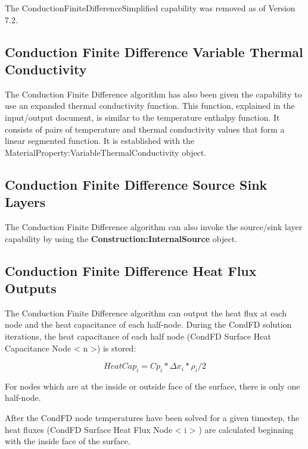 The ConductionFiniteDifferenceSimplified capability was removed as of Version 7.2.

\subsection{Conduction Finite Difference Variable Thermal Conductivity}\label{conduction-finite-difference-variable-thermal-conductivity}

The Conduction Finite Difference algorithm has also been given the capability to use an expanded thermal conductivity function. This function, explained in the input/output document, is similar to the temperature enthalpy function. It consists of pairs of temperature and thermal conductivity values that form a linear segmented function. It is established with the MaterialProperty:VariableThermalConductivity object.

\subsection{Conduction Finite Difference Source Sink Layers}\label{conduction-finite-difference-source-sink-layers}

The Conduction Finite Difference algorithm can also invoke the source/sink layer capability by using the \textbf{Construction:InternalSource} object.

\subsection{Conduction Finite Difference Heat Flux Outputs}\label{conduction-finite-difference-heat-flux-outputs}

The Conduction Finite Difference algorithm can output the heat flux at each node and the heat capacitance of each half-node. During the CondFD solution iterations, the heat capacitance of each half node (CondFD Surface Heat Capacitance Node \textless{} n \textgreater{}) is stored:

\begin{equation}
{HeatCap_{i} = Cp_{i}*\Delta x_{i}*\rho_{i}/2}
\end{equation}

For nodes which are at the inside or outside face of the surface, there is only one half-node.

After the CondFD node temperatures have been solved for a given timestep, the heat fluxes (CondFD Surface Heat Flux Node \textless{} i \textgreater{} ) are calculated beginning with the inside face of the surface.

